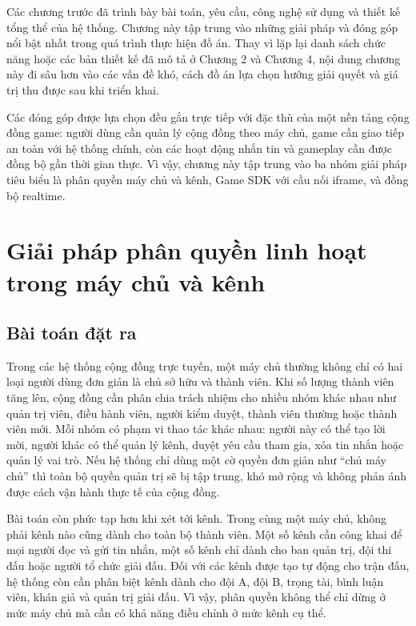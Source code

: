 \documentclass[../DoAn.tex]{subfiles}
\begin{document}
Các chương trước đã trình bày bài toán, yêu cầu, công nghệ sử dụng và thiết kế tổng thể của hệ thống. Chương này tập trung vào những giải pháp và đóng góp nổi bật nhất trong quá trình thực hiện đồ án. Thay vì lặp lại danh sách chức năng hoặc các bản thiết kế đã mô tả ở Chương 2 và Chương 4, nội dung chương này đi sâu hơn vào các vấn đề khó, cách đồ án lựa chọn hướng giải quyết và giá trị thu được sau khi triển khai.

Các đóng góp được lựa chọn đều gắn trực tiếp với đặc thù của một nền tảng cộng đồng game: người dùng cần quản lý cộng đồng theo máy chủ, game cần giao tiếp an toàn với hệ thống chính, còn các hoạt động nhắn tin và gameplay cần được đồng bộ gần thời gian thực. Vì vậy, chương này tập trung vào ba nhóm giải pháp tiêu biểu là phân quyền máy chủ và kênh, Game SDK với cầu nối iframe, và đồng bộ realtime.

\section{Giải pháp phân quyền linh hoạt trong máy chủ và kênh}
\label{section:5.1}

\subsection{Bài toán đặt ra}
\label{subsection:5.1.1}

Trong các hệ thống cộng đồng trực tuyến, một máy chủ thường không chỉ có hai loại người dùng đơn giản là chủ sở hữu và thành viên. Khi số lượng thành viên tăng lên, cộng đồng cần phân chia trách nhiệm cho nhiều nhóm khác nhau như quản trị viên, điều hành viên, người kiểm duyệt, thành viên thường hoặc thành viên mới. Mỗi nhóm có phạm vi thao tác khác nhau: người này có thể tạo lời mời, người khác có thể quản lý kênh, duyệt yêu cầu tham gia, xóa tin nhắn hoặc quản lý vai trò. Nếu hệ thống chỉ dùng một cờ quyền đơn giản như “chủ máy chủ” thì toàn bộ quyền quản trị sẽ bị tập trung, khó mở rộng và không phản ánh được cách vận hành thực tế của cộng đồng.

Bài toán còn phức tạp hơn khi xét tới kênh. Trong cùng một máy chủ, không phải kênh nào cũng dành cho toàn bộ thành viên. Một số kênh cần công khai để mọi người đọc và gửi tin nhắn, một số kênh chỉ dành cho ban quản trị, đội thi đấu hoặc người tổ chức giải đấu. Đối với các kênh được tạo tự động cho trận đấu, hệ thống còn cần phân biệt kênh dành cho đội A, đội B, trọng tài, bình luận viên, khán giả và quản trị giải đấu. Vì vậy, phân quyền không thể chỉ dừng ở mức máy chủ mà cần có khả năng điều chỉnh ở mức kênh cụ thể.
\end{document}
